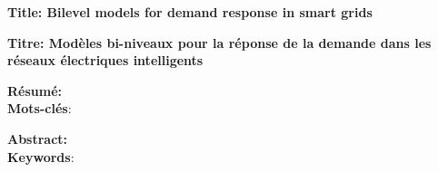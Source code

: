 
{\footnotesize
\textbf{Title: Bilevel models for demand response in smart grids}

\textbf{Titre: Modèles bi-niveaux pour la réponse de la demande dans les réseaux électriques intelligents}

\textbf{Résumé:}\\


\textbf{Mots-clés}: \mesMotsClefFR

\textbf{Abstract:}\\


\textbf{Keywords}: \mesMotsClef
}
